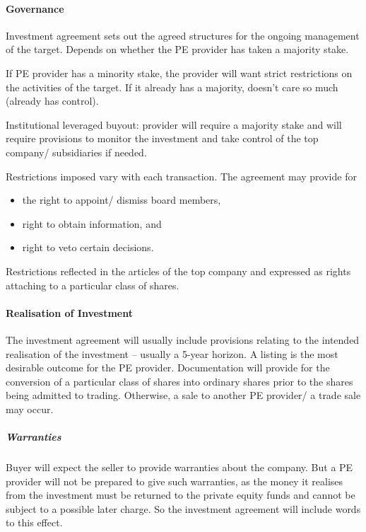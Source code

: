\documentclass[
]{article}
\providecommand{\tightlist}{%
  \setlength{\itemsep}{0pt}\setlength{\parskip}{0pt}}
\begin{document}
\hypertarget{governance}{%
\paragraph{Governance}\label{governance}}

Investment agreement sets out the agreed structures for the ongoing
management of the target. Depends on whether the PE provider has taken a
majority stake.

If PE provider has a minority stake, the provider will want strict
restrictions on the activities of the target. If it already has a
majority, doesn't care so much (already has control).

Institutional leveraged buyout: provider will require a majority stake
and will require provisions to monitor the investment and take control
of the top company/ subsidiaries if needed.

Restrictions imposed vary with each transaction. The agreement may
provide for

\begin{itemize}
\tightlist
\item
  the right to appoint/ dismiss board members,
\item
  right to obtain information, and
\item
  right to veto certain decisions.
\end{itemize}

Restrictions reflected in the articles of the top company and expressed
as rights attaching to a particular class of shares.

\hypertarget{realisation-of-investment}{%
\paragraph{Realisation of Investment}\label{realisation-of-investment}}

The investment agreement will usually include provisions relating to the
intended realisation of the investment -- usually a 5-year horizon. A
listing is the most desirable outcome for the PE provider. Documentation
will provide for the conversion of a particular class of shares into
ordinary shares prior to the shares being admitted to trading.
Otherwise, a sale to another PE provider/ a trade sale may occur.

\hypertarget{warranties-1}{%
\subparagraph{Warranties}\label{warranties-1}}

Buyer will expect the seller to provide warranties about the company.
But a PE provider will not be prepared to give such warranties, as the
money it realises from the investment must be returned to the private
equity funds and cannot be subject to a possible later charge. So the
investment agreement will include words to this effect.
\end{document}
